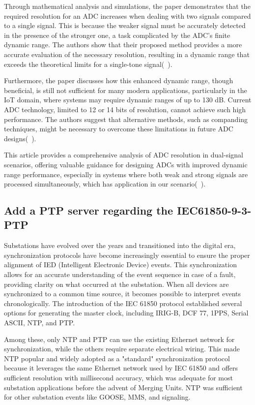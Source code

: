 Through mathematical analysis and simulations, the paper demonstrates that the required resolution for an ADC increases when dealing with two signals compared to a single signal. This is because the weaker signal must be accurately detected in the presence of the stronger one, a task complicated by the ADC's finite dynamic range. The authors show that their proposed method provides a more accurate evaluation of the necessary resolution, resulting in a dynamic range that exceeds the theoretical limits for a single-tone signal(~\cite{laporte2024adc}).

Furthermore, the paper discusses how this enhanced dynamic range, though beneficial, is still not sufficient for many modern applications, particularly in the IoT domain, where systems may require dynamic ranges of up to 130 dB. Current ADC technology, limited to 12 or 14 bits of resolution, cannot achieve such high performance. The authors suggest that alternative methods, such as companding techniques, might be necessary to overcome these limitations in future ADC designs(~\cite{laporte2024adc}).

This article provides a comprehensive analysis of ADC resolution in dual-signal scenarios, offering valuable guidance for designing ADCs with improved dynamic range performance, especially in systems where both weak and strong signals are processed simultaneously, which has application in our scenario(~\cite{laporte2024adc}).


\subsection{Add a PTP server regarding the IEC61850-9-3-PTP}

Substations have evolved over the years and transitioned into the digital era, synchronization protocols have become increasingly essential to ensure the proper alignment of IED (Intelligent Electronic Device) events. This synchronization allows for an accurate understanding of the event sequence in case of a fault, providing clarity on what occurred at the substation. When all devices are synchronized to a common time source, it becomes possible to interpret events chronologically. The introduction of the IEC 61850 protocol established several options for generating the master clock, including IRIG-B, DCF 77, 1PPS, Serial ASCII, NTP, and PTP.

Among these, only NTP and PTP can use the existing Ethernet network for synchronization, while the others require separate electrical wiring. This made NTP popular and widely adopted as a "standard" synchronization protocol because it leverages the same Ethernet network used by IEC 61850 and offers sufficient resolution with millisecond accuracy, which was adequate for most substation applications before the advent of Merging Units. NTP was sufficient for other substation events like GOOSE, MMS, and signaling.

